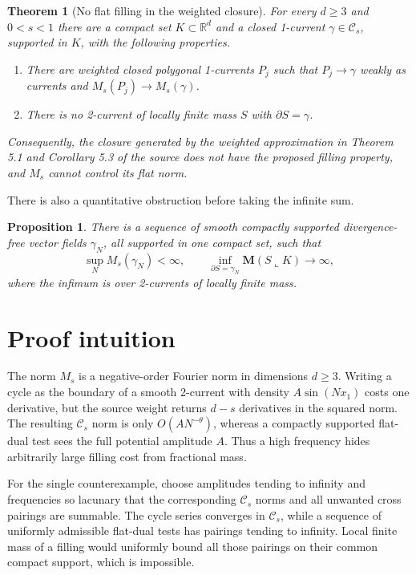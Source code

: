 \documentclass[11pt]{article}
\newtheorem{theorem}{Theorem}
\newtheorem{proposition}{Proposition}
\newcommand{\R}{\mathbb{R}}
\newcommand{\Cs}{\mathcal{C}_s}
\newcommand{\M}{\mathbf{M}}
\begin{document}
\begin{theorem}[No flat filling in the weighted closure]\label{main-thm}
For every $d\ge3$ and $0<s<1$ there are a compact set $K\subset\R^d$ and a
closed 1-current $\gamma\in\Cs$, supported in $K$, with the following
properties.
\begin{enumerate}
\item There are weighted closed polygonal 1-currents $P_j$ such that
      $P_j\to\gamma$ weakly as currents and
      $M_s(P_j)\to M_s(\gamma)$.
\item There is no 2-current of locally finite mass $S$ with
      $\partial S=\gamma$.
\end{enumerate}
Consequently, the closure generated by the weighted approximation in
Theorem 5.1 and Corollary 5.3 of the source does not have the proposed filling
property, and $M_s$ cannot control its flat norm.
\end{theorem}

There is also a quantitative obstruction before taking the infinite sum.

\begin{proposition}\label{smooth-prop}
There is a sequence of smooth compactly supported divergence-free vector
fields $\gamma_N$, all supported in one compact set, such that
\[
  \sup_N M_s(\gamma_N)<\infty,
  \qquad
  \inf_{\partial S=\gamma_N}
     \M(S\mathbin{\llcorner}K)
     \longrightarrow\infty,
\]
where the infimum is over 2-currents of locally finite mass.
\end{proposition}

\section{Proof intuition}

The norm $M_s$ is a negative-order Fourier norm in dimensions $d\ge3$.
Writing a cycle as the boundary of a smooth 2-current with density
$A\sin(Nx_1)$ costs one derivative, but the source weight returns
$d-s$ derivatives in the squared norm.  The resulting $\Cs$ norm is only
$O(A N^{-\theta})$, whereas a compactly supported flat-dual test sees the
full potential amplitude $A$.  Thus a high frequency hides arbitrarily large
filling cost from fractional mass.

For the single counterexample, choose amplitudes tending to infinity and
frequencies so lacunary that the corresponding $\Cs$ norms and all unwanted
cross pairings are summable.  The cycle series converges in $\Cs$, while a
sequence of uniformly admissible flat-dual tests has pairings tending to
infinity.  Local finite mass of a filling would uniformly bound all those
pairings on their common compact support, which is impossible.
\end{document}
